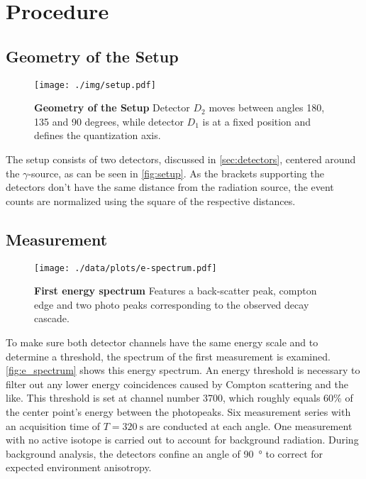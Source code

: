 \chapter{Procedure}

\section{Geometry of the Setup}\label{sec:geom}
\begin{figure}[tbp]
	\centering
	\texttt{[image: ./img/setup.pdf]}
	\caption[Geometry of the Setup]{\textbf{Geometry of the Setup} Detector $D_2$ moves between angles 180, 135 and 90 degrees, while detector $D_1$ is at a fixed position and defines the quantization axis.}
	\label{fig:setup}
\end{figure}
The setup consists of two detectors, discussed in \autoref{sec:detectors}, centered around the $\gamma$-source, as can be seen in \autoref{fig:setup}.
As the brackets supporting the detectors don't have the same distance from the radiation source, the event counts are normalized using the square of the respective distances.

\section{Measurement}
\begin{figure}[tbp]
	\centering
	\texttt{[image: ./data/plots/e-spectrum.pdf]}
	\caption[First energy spectrum]{\textbf{First energy spectrum} Features a back-scatter peak, compton edge and two photo peaks corresponding to the observed decay cascade.}
	\label{fig:e_spectrum}
\end{figure}
To make sure both detector channels have the same energy scale and to determine a threshold, the spectrum of the first measurement is examined.
\autoref{fig:e_spectrum} shows this energy spectrum.
An energy threshold is necessary to filter out any lower energy coincidences caused by Compton scattering and the like.
This threshold is set at channel number 3700, which roughly equals 60\% of the center point's energy between the photopeaks.
Six measurement series with an acquisition time of $T=\SI{320}{\second}$ are conducted at each angle.
One measurement with no active isotope is carried out to account for background radiation.
During background analysis, the detectors confine an angle of \SI{90}{\degree} to correct for expected environment anisotropy.
